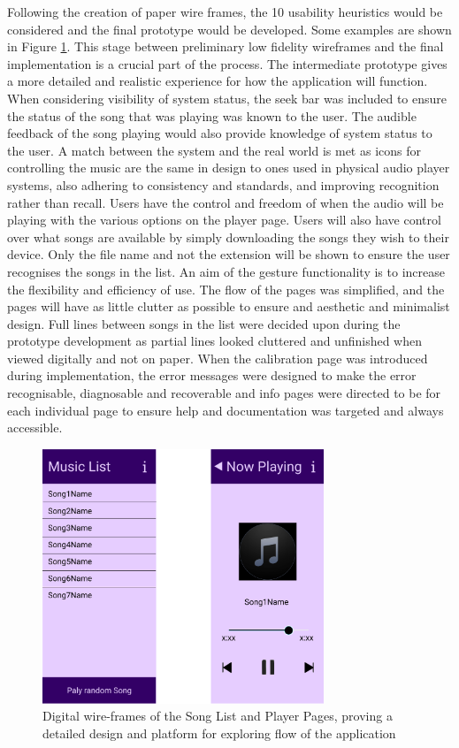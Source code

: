 \documentclass{l4proj}
\begin{document}
Following the creation of paper wire frames, the 10 usability heuristics would be considered and the final prototype would be developed. Some examples are shown in Figure \ref{fig:digitalWF}. This stage between preliminary low fidelity wireframes and the final implementation is a crucial part of the process. The intermediate prototype gives a more detailed and realistic experience for how the application will function. When considering visibility of system status, the seek bar was included to ensure the status of the song that was playing was known to the user. The audible feedback of the song playing would also provide knowledge of system status to the user. A match between the system and the real world is met as icons for controlling the music are the same in design to ones used in physical audio player systems, also adhering to consistency and standards, and improving recognition rather than recall. Users have the control and freedom of when the audio will be playing with the various options on the player page. Users will also have control over what songs are available by simply downloading the songs they wish to their device. Only the file name and not the extension will be shown to ensure the user recognises the songs in the list. An aim of the gesture functionality is to increase the flexibility and efficiency of use. The flow of the pages was simplified, and the pages will have as little clutter as possible to ensure and aesthetic and minimalist design. Full lines between songs in the list were decided upon during the prototype development as partial lines looked cluttered and unfinished when viewed digitally and not on paper. When the calibration page was introduced during implementation, the error messages were designed to make the error recognisable, diagnosable and recoverable and info pages were directed to be for each individual page to ensure help and documentation was targeted and always accessible.

\begin{figure}[!htb]
    \centering
    \includegraphics[width=0.75\textwidth]{images/DigWireframes.PNG}
        \caption{Digital wire-frames of the Song List and Player Pages, proving a detailed design and platform for exploring flow of the application}
        \label{fig:digitalWF}
\end{figure}
\end{document}
